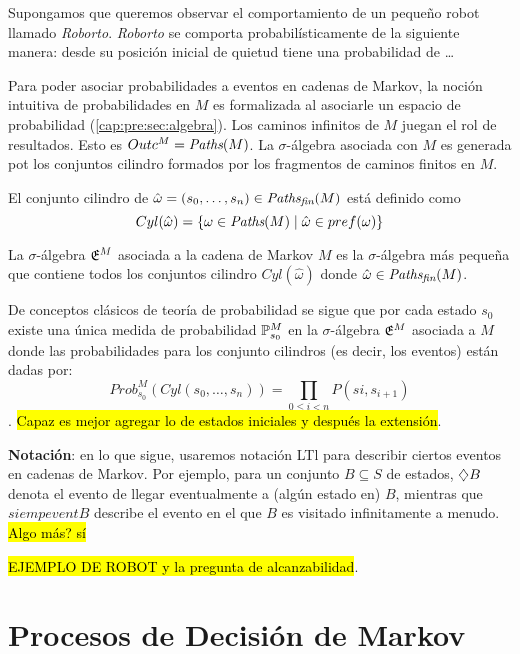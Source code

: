 \begin{example}
	Supongamos que queremos observar el comportamiento de un pequeño robot llamado \textit{Roborto}. \textit{Roborto} se comporta probabilísticamente de la siguiente manera: desde su posición inicial de quietud tiene una probabilidad de \dots
\end{example}

Para poder asociar probabilidades a eventos en cadenas de Markov, la noción
intuitiva de probabilidades en $M$ es formalizada al asociarle un espacio de
probabilidad (\ref{cap:pre:sec:algebra}). Los caminos infinitos de $M$ juegan
el rol de resultados. Esto es $Outc^M = \textit{Paths}(M)$. La $\sigma$-álgebra
asociada con $M$ es generada pot los conjuntos cilindro formados por los
fragmentos de caminos finitos en $M$.

\begin{definition}
	El conjunto cilindro de $\hat \omega = (s_0, \dots, s_n) \in \textit{Paths}_\textit{fin}(M)$ está definido como
	$$Cyl(\hat \omega) = \{\omega \in \textit{Paths}(M) \mid \hat \omega \in pref(\omega)\}$$
\end{definition}

\begin{definition}
	La $\sigma$-álgebra $\mathfrak{E}^M$ asociada a la cadena de Markov $M$ es la $\sigma$-álgebra más pequeña que contiene todos los conjuntos cilindro $Cyl(\hat \omega)$ donde $\hat \omega \in \textit{Paths}_\textit{fin}(M)$.
\end{definition}

De conceptos clásicos de teoría de probabilidad se sigue que por cada estado
$s_0$ existe una única medida de probabilidad $\mathbb{P}^M_{s_0}$ en la
$\sigma$-álgebra $\mathfrak{E}^M$ asociada a $M$ donde las probabilidades para los
conjunto cilindros (es decir, los eventos) están dadas por:
$$Prob^M_{s_0}(Cyl(s_0, \dots, s_n)) = \prod_{0 \leq i < n} P(si, s_{i+1})$$.
\hl{Capaz es mejor agregar lo de estados iniciales y después la extensión}.

\textbf{Notación}: en lo que sigue, usaremos notación LTl para describir ciertos eventos en cadenas de Markov. Por ejemplo, para un conjunto $B \subseteq S$ de estados, $\diamondsuit B$ denota el evento de llegar eventualmente a (algún estado en) $B$, mientras que $siempevent B$ describe el evento en el que $B$ es visitado infinitamente a menudo. \hl{Algo más? sí}

\hl{EJEMPLO DE ROBOT y la pregunta de alcanzabilidad}.

\section{Procesos de Decisión de Markov}

